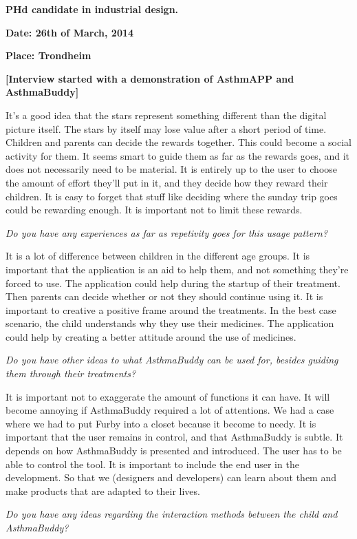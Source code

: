 \textbf{PHd candidate in industrial design.} 

\textbf{Date: 26th of March, 2014}

\textbf{Place: Trondheim}

\textbf{[Interview started with a demonstration of AsthmAPP and AsthmaBuddy]}

It's a good idea that the stars represent something different than the digital picture itself. The stars by itself may lose value after a short period of time. Children and parents can decide the rewards together. This could become a social activity for them. 
It seems smart to guide them as far as the rewards goes, and it does not necessarily need to be material. It is entirely up to the user to choose the amount of effort they'll put in it, and they decide how they reward their children. It is easy to forget that stuff like deciding where the sunday trip goes could be rewarding enough. It is important not to limit these rewards. 

\emph{Do you have any experiences as far as repetivity goes for this usage pattern?}

It is a lot of difference between children in the different age groups. It is important that the application is an aid to help them, and not something they're forced to use. The application could help during the startup of their treatment. Then parents can decide whether or not they should continue using it. It is important to creative a positive frame around the treatments. In the best case scenario, the child understands why they use their medicines. The application could help by creating a better attitude around the use of medicines. 

\emph{Do you have other ideas to what AsthmaBuddy can be used for, besides guiding them through their treatments?}

It is important not to exaggerate the amount of functions it can have. It will become annoying if AsthmaBuddy required a lot of attentions. We had a case where we had to put Furby into a closet because it become to needy. It is important that the user remains in control, and that AsthmaBuddy is subtle. It depends on how AsthmaBuddy is presented and introduced. The user has to be able to control the tool. It is important to include the end user in the development. So that we (designers and developers) can learn about them and make products that are adapted to their lives.   

\emph{Do you have any ideas regarding the interaction methods between the child and AsthmaBuddy?}

